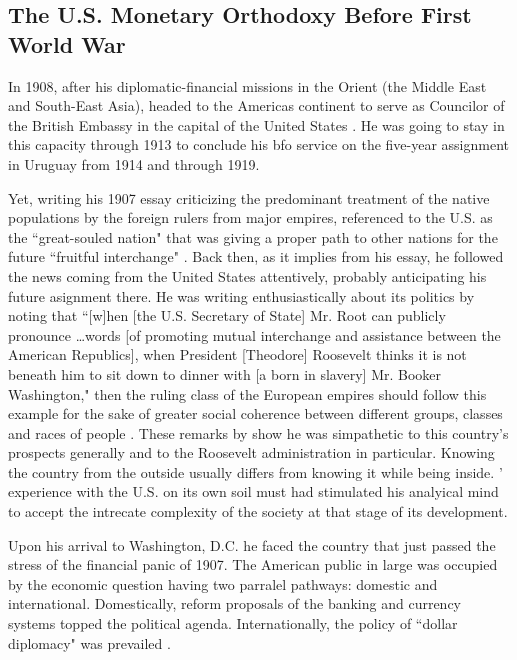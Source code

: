 \subsection{The U.S. Monetary Orthodoxy Before First World War}\label{sec:mon_orthodoxy}

In 1908, after his diplomatic-financial missions in the Orient (the Middle East and South-East Asia), \citeauthor{innes1913} headed to the Americas continent to serve as Councilor of the British Embassy in the capital of the United States \citep[p.~4]{wray2004}. He was going to stay in this capacity through 1913 to conclude his \ac{bfo} service on the five-year assignment in Uruguay from 1914 and through 1919.

Yet, writing his 1907 essay criticizing the predominant treatment of the native populations by the foreign rulers from major empires, \citeauthor{innes1907} referenced to the U.S. as the ``great-souled nation" that was giving a proper path to other nations for the future ``fruitful interchange" . Back then, as it implies from his essay, he followed the news coming from the United States attentively, probably anticipating his future asignment there. He was writing enthusiastically about its politics by noting that ``[w]hen [the U.S. Secretary of State] Mr. Root can publicly pronounce \dots words [of promoting mutual interchange and assistance between the American Republics], when President [Theodore] Roosevelt thinks it is not beneath him to sit down to dinner with [a born in slavery] Mr. Booker Washington," then the ruling class of the European empires should follow this example for the sake of greater social coherence between different groups, classes and races of people \citep[p.~47]{innes1907}. These remarks by \citeauthor{innes1907} show he was simpathetic to this country's prospects generally and to the Roosevelt administration in particular. Knowing the country from the outside usually differs from knowing it while being inside. \citeauthor{innes1907}' experience with the U.S. on its own soil must had stimulated his analyical mind to accept the intrecate complexity of the society at that stage of its development.

Upon his arrival to Washington, D.C. he faced the country that just passed the stress of the financial panic of 1907. The American public in large was occupied by the economic question having two parralel pathways: domestic and international. Domestically, reform proposals of the banking and currency systems topped the political agenda. Internationally, the policy of ``dollar diplomacy" was prevailed \citep{rosenberg1999}.

